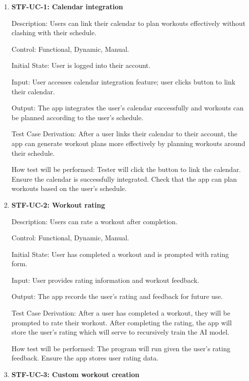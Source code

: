\documentclass[12pt, titlepage]{article}
\begin{document}
    \begin{enumerate}

        \item{\textbf{STF-UC-1: Calendar integration}\\}

        Description: Users can link their calendar to plan workouts effectively without clashing with their schedule.

        Control: Functional, Dynamic, Manual.

        Initial State: User is logged into their account.

        Input: User accesses calendar integration feature; user clicks button to link their calendar.

        Output: The app integrates the user’s calendar successfully and workouts can be planned according to the user’s schedule.

        Test Case Derivation: After a user links their calendar to their account, the app can generate workout plans more effectively by planning workouts around their schedule.

        How test will be performed: Tester will click the button to link the calendar. Ensure the calendar is successfully integrated. Check that the app can plan workouts based on the user’s schedule.

        \item{\textbf{STF-UC-2: Workout rating}\\}

        Description: Users can rate a workout after completion.

        Control: Functional, Dynamic, Manual.

        Initial State: User has completed a workout and is prompted with rating form.

        Input: User provides rating information and workout feedback.

        Output: The app records the user’s rating and feedback for future use.

        Test Case Derivation: After a user has completed a workout, they will be prompted to rate their workout. After completing the rating, the app will store the user’s rating which will serve to recursively train the AI model.

        How test will be performed: The program will run given the user’s rating feedback. Ensure the app stores user rating data.

        \item{\textbf{STF-UC-3: Custom workout creation}\\}


\end{enumerate}
\end{document}
